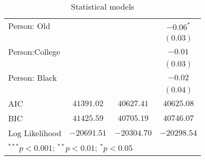 \begin{table}
\begin{center}
\begin{tabular}{l c c c}
Person: Old    &               &               & $-0.06^{*}$   \\
               &               &               & $(0.03)$      \\
Person:College &               &               & $-0.01$       \\
               &               &               & $(0.03)$      \\
Person: Black  &               &               & $-0.02$       \\
               &               &               & $(0.04)$      \\
\midrule
AIC            & $41391.02$    & $40627.41$    & $40625.08$    \\
BIC            & $41425.59$    & $40705.19$    & $40746.07$    \\
Log Likelihood & $-20691.51$   & $-20304.70$   & $-20298.54$   \\
\bottomrule
\multicolumn{4}{l}{\scriptsize{$^{***}p<0.001$; $^{**}p<0.01$; $^{*}p<0.05$}}
\end{tabular}
\caption{Statistical models}
\label{table:coefficients}
\end{center}
\end{table}
